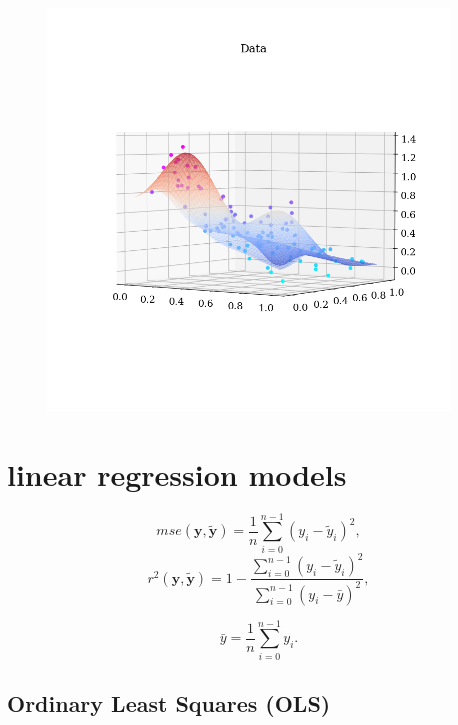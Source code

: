 \documentclass[twoside,11pt]{report}
\begin{document}
\begin{figure}
    \begin{center}
        \includegraphics[width=0.95\textwidth]{../runsAndAdditions/synthDataSide.png}
    \end{center}
\end{figure}










\section{linear regression models }
\label{sec:models}



$$
mse(\mathbf{y},\mathbf{\tilde{y}}) = \frac{1}{n}
\sum_{i=0}^{n-1}(y_i-\tilde{y}_i)^2,
$$
$$
r^2(\mathbf{y}, \tilde{\mathbf{y}}) = 1 - \frac{\sum_{i=0}^{n - 1} (y_i - \tilde{y}_i)^2}{\sum_{i=0}^{n - 1} (y_i - \bar{y})^2},
$$

$$
\bar{y} =  \frac{1}{n} \sum_{i=0}^{n - 1} y_i.
$$








\subsection{Ordinary Least Squares (OLS)}
\label{sec:ols}
\end{document}
